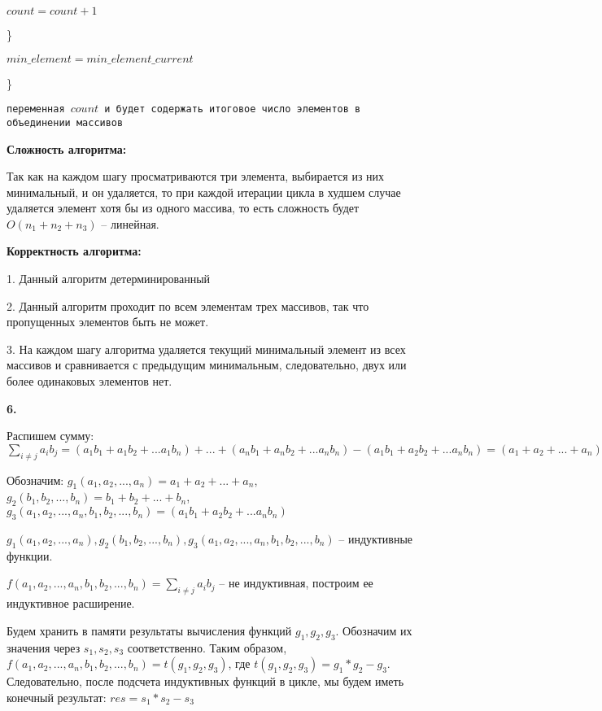 \documentclass[12pt]{extreport}
\begin{document}
	\hspace{8mm} $count = count +1 $ 
	
	\hspace{4mm}\}
	
	\hspace{4mm} $ min\_element = min\_element\_current$
	
	\}
	
	{\tt переменная $count$ и будет содержать итоговое число элементов в объединении массивов}
	
	\bigskip
	
	{\bf Сложность алгоритма:}	
	
	Так как на каждом шагу просматриваются три элемента, выбирается из них минимальный, и он удаляется, то при каждой итерации цикла в худшем случае удаляется элемент хотя бы из одного массива, то есть сложность будет $O(n_1 + n_2 + n_3)$ -- линейная. 
	\bigskip
	
	{\bf Корректность алгоритма:}	
	
	1. Данный алгоритм детерминированный
	
	2. Данный алгоритм проходит по всем элементам трех массивов, так что пропущенных элементов быть не может.
	
	3. На каждом шагу алгоритма удаляется текущий минимальный элемент из всех массивов и сравнивается с предыдущим минимальным, следовательно, двух или более одинаковых элементов нет. 
	
	
	\bigskip
	
	{\bf 6.}
	
	Распишем сумму: $\sum\limits_{i \neq j} a_ib_j = (a_1b_1 + a_1b_2 + ...a_1b_n) + ... + (a_nb_1 + a_nb_2 + ...a_nb_n) - (a_1b_1 + a_2b_2 + ...a_nb_n) = (a_1 + a_2 + ... + a_n)(b_1 + b_2 + ... + b_n) - (a_1b_1 + a_2b_2 + ...a_nb_n)$
	
	Обозначим: $g_1(a_1, a_2, ..., a_n) = a_1 + a_2 + ... + a_n$, $g_2(b_1, b_2, ..., b_n) = b_1 + b_2 + ... + b_n$, $g_3(a_1, a_2, ..., a_n, b_1, b_2, ..., b_n) = (a_1b_1 + a_2b_2 + ...a_nb_n)$
	
	$g_1(a_1, a_2, ..., a_n), g_2(b_1, b_2, ..., b_n), g_3(a_1, a_2, ..., a_n, b_1, b_2, ..., b_n)$ -- индуктивные функции. 
	
	$f(a_1, a_2, ..., a_n, b_1, b_2, ..., b_n) = \sum\limits_{i \neq j} a_ib_j $ -- не индуктивная, построим ее индуктивное расширение.
	
	Будем хранить в памяти результаты вычисления функций $g_1, g_2, g_3$. Обозначим их значения через $s_1, s_2, s_3$ соответственно. Таким образом, $f(a_1, a_2, ..., a_n, b_1, b_2, ..., b_n) = t(g_1, g_2, g_3)$, где $t(g_1, g_2, g_3) = g_1*g_2-g_3$. Следовательно, после подсчета индуктивных функций в цикле, мы будем иметь конечный результат: $ res = s_1*s_2-s_3$
	
\end{document}
